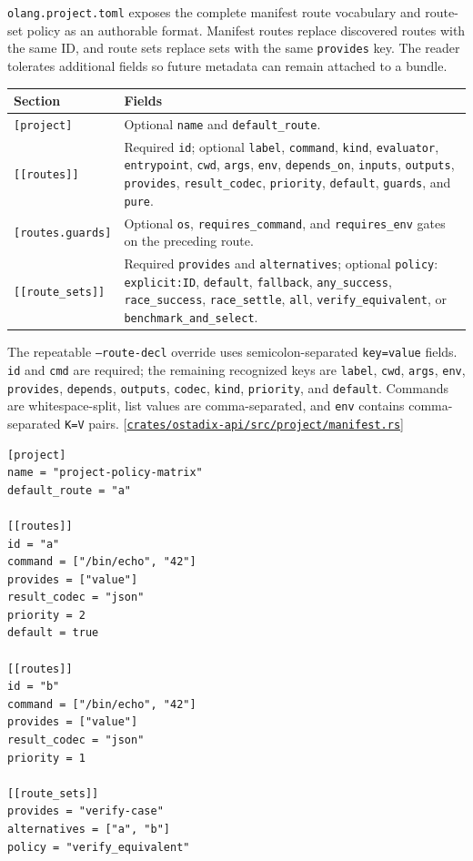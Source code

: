 \documentclass[11pt,oneside]{article}
\newcommand{\src}[1]{\textcolor{OSlate}{\scriptsize[\href{https://github.com/lostadi/OSTADIX/blob/c0b02c326b2329a95ba52447c7180bc93957cd57/#1}{\nolinkurl{#1}}]}\allowbreak}
\begin{document}
\texttt{olang.project.toml} exposes the complete manifest route vocabulary and
route-set policy as an authorable format. Manifest routes replace discovered
routes with the same ID, and route
sets replace sets with the same \texttt{provides} key. The reader tolerates
additional fields so future metadata can remain attached to a bundle.

\begin{longtable}{P{0.21\textwidth} P{0.71\textwidth}}
\toprule
\textbf{Section} & \textbf{Fields} \\
\midrule
\endhead
\texttt{[project]} & Optional \texttt{name} and \texttt{default\_route}. \\
\texttt{[[routes]]} & Required \texttt{id}; optional \texttt{label},
\texttt{command}, \texttt{kind}, \texttt{evaluator}, \texttt{entrypoint},
\texttt{cwd}, \texttt{args}, \texttt{env}, \texttt{depends\_on},
\texttt{inputs}, \texttt{outputs}, \texttt{provides},
\texttt{result\_codec}, \texttt{priority}, \texttt{default},
\texttt{guards}, and \texttt{pure}. \\
\texttt{[routes.guards]} & Optional \texttt{os},
\texttt{requires\_command}, and \texttt{requires\_env} gates on the preceding
route. \\
\texttt{[[route\_sets]]} & Required \texttt{provides} and
\texttt{alternatives}; optional \texttt{policy}: \texttt{explicit:ID},
\texttt{default}, \texttt{fallback}, \texttt{any\_success},
\texttt{race\_success}, \texttt{race\_settle}, \texttt{all},
\texttt{verify\_equivalent}, or \texttt{benchmark\_and\_select}. \\
\bottomrule
\end{longtable}

The repeatable \texttt{--route-decl} override uses semicolon-separated
\texttt{key=value} fields. \texttt{id} and \texttt{cmd} are required; the
remaining recognized keys are \texttt{label}, \texttt{cwd}, \texttt{args},
\texttt{env}, \texttt{provides}, \texttt{depends}, \texttt{outputs},
\texttt{codec}, \texttt{kind}, \texttt{priority}, and \texttt{default}.
Commands are whitespace-split, list values are comma-separated, and
\texttt{env} contains comma-separated \texttt{K=V} pairs.
\src{crates/ostadix-api/src/project/manifest.rs}

\begin{lstlisting}[style=plaincode]
[project]
name = "project-policy-matrix"
default_route = "a"

[[routes]]
id = "a"
command = ["/bin/echo", "42"]
provides = ["value"]
result_codec = "json"
priority = 2
default = true

[[routes]]
id = "b"
command = ["/bin/echo", "42"]
provides = ["value"]
result_codec = "json"
priority = 1

[[route_sets]]
provides = "verify-case"
alternatives = ["a", "b"]
policy = "verify_equivalent"
\end{lstlisting}
\end{document}
